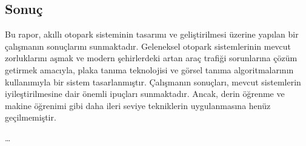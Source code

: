 \documentclass[]{article}
\begin{document}
	\subsection{Sonuç}
	Bu rapor, akıllı otopark sisteminin tasarımı ve geliştirilmesi üzerine yapılan bir çalışmanın sonuçlarını sunmaktadır. Geleneksel otopark sistemlerinin mevcut zorluklarını aşmak ve modern şehirlerdeki artan araç trafiği sorunlarına çözüm getirmek amacıyla, plaka tanıma teknolojisi ve görsel tanıma algoritmalarının kullanımıyla bir sistem tasarlanmıştır. Çalışmanın sonuçları, mevcut sistemlerin iyileştirilmesine dair önemli ipuçları sunmaktadır. Ancak, derin öğrenme ve makine öğrenimi gibi daha ileri seviye tekniklerin uygulanmasına henüz geçilmemiştir.
	\newpage
	
	
	\dots{}
	
\end{document}
